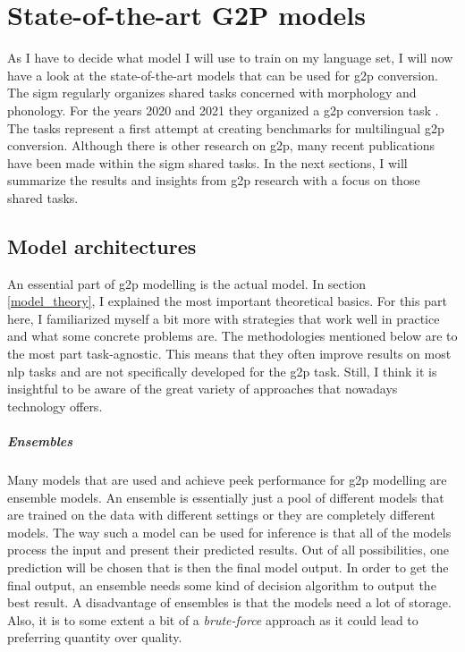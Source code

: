 \section{State-of-the-art G2P models}
\label{section:sig}
As I have to decide what model I will use to train on my language set, I will now have a look at the state-of-the-art models that can be used for \ac{g2p} conversion.  
The \ac{sigm} \citep{Sigmorphon.2021} regularly organizes shared tasks concerned with morphology and phonology. For the years 2020 and 2021 they organized a \ac{g2p} conversion task \citep{Ashby-Bartley.2021, gorman-etal-2020-sigmorphon}. The tasks represent a first attempt at creating benchmarks for multilingual \ac{g2p} conversion. Although there is other research on \ac{g2p}, many recent publications have been made within the \ac{sigm} shared tasks. In the next sections, I will summarize the results and insights from \ac{g2p} research with a focus on those shared tasks.

\subsection{Model architectures}
An essential part of \ac{g2p} modelling is the actual model. In section \ref{model_theory}, I explained the most important theoretical basics. For this part here, I familiarized myself a bit more with strategies that work well in practice and what some concrete problems are. The methodologies mentioned below are to the most part task-agnostic. This means that they often improve results on most \ac{nlp} tasks and are not specifically developed for the \ac{g2p} task. Still, I think it is insightful to be aware of the great variety of approaches that nowadays technology offers. 

\subparagraph{Ensembles}
Many models that are used and achieve peek performance for \ac{g2p} modelling are ensemble models. An ensemble is essentially just a pool of different models that are trained on the data with different settings or they are completely different models. The way such a model can be used for inference is that all of the models process the input and present their predicted results. Out of all possibilities, one prediction will be chosen that is then the final model output. In order to get the final output, an ensemble needs some kind of decision algorithm to output the best result. A disadvantage of ensembles is that the models need a lot of storage. Also, it is to some extent a bit of a \textit{brute-force} approach as it could lead to preferring quantity over quality. 

